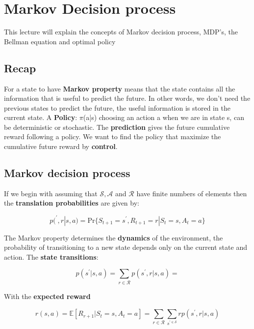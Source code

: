 
\section{Markov Decision process}
This lecture will explain the concepts of Markov decision process, MDP's, the Bellman equation and optimal policy

\subsection{Recap}
For a state to have \textbf{Markov property} means that the state contains all the information that is useful to predict the future. In other words, we don't need the previous states to predict the future, the useful information is stored in the current state. A \textbf{Policy}: $\pi$(a|s) choosing an action a when we are in state s, can be deterministic or stochastic. The \textbf{prediction} gives the future cumulative reward following a policy. We want to find the policy that maximize the cumulative future reward by \textbf{control}. 

\subsection{Markov decision process}
If we begin with assuming that $\mathcal{S}, \mathcal{A} $ and $\mathcal{R}$ have finite numbers of elements then the \textbf{translation probabilities} are given by:

	\begin{equation}
		p(^{\prime},r |s,a) = \text{Pr}\{S_{t+1} = s^{\prime}, R_{t+1} = r | S_t = s, A_t = a \}
	\end{equation}

The Markov property determines the \textbf{dynamics} of the environment, the probability of transitioning to a new state depends only on the current state and action. The \textbf{state transitions}:

	\begin{equation}
		p(s^{\prime} | s,a) = \sum_{r \in \mathcal{R}} p(s^{\prime},r |s,a) =
	\end{equation}

With the \textbf{expected reward }

	\begin{equation}
		r(s,a) = \mathbb{E} [ R_{r+1} | S_t = s, A_t = a ] =  \sum_{r \in \mathcal{R}}^{} \sum_{s^{\prime \in \mathcal{S}}}^{} r p(s^{\prime},r | s,a)  
	\end{equation}

